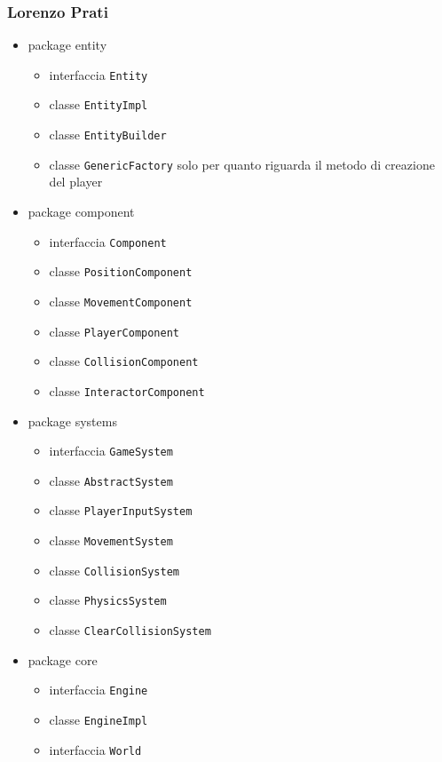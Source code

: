 \documentclass[a4paper,12pt]{report}
\begin{document}
\subsubsection{Lorenzo Prati}

	\begin{itemize}
		\item package entity
			\begin{itemize}
				\item interfaccia \texttt{Entity}
				\item classe \texttt{EntityImpl}
				\item classe \texttt{EntityBuilder}
				\item classe \texttt{GenericFactory} solo per quanto riguarda il metodo di creazione del player
			\end{itemize}
		\item package component
			\begin{itemize}
				\item interfaccia \texttt{Component}
				\item classe \texttt{PositionComponent}
				\item classe \texttt{MovementComponent}
				\item classe \texttt{PlayerComponent}
				\item classe \texttt{CollisionComponent}
				\item classe \texttt{InteractorComponent}
			\end{itemize}
		\item package systems
			\begin{itemize}
				\item interfaccia \texttt{GameSystem}
				\item classe \texttt{AbstractSystem}
				\item classe \texttt{PlayerInputSystem}
				\item classe \texttt{MovementSystem}
				\item classe \texttt{CollisionSystem}
				\item classe \texttt{PhysicsSystem}
				\item classe \texttt{ClearCollisionSystem}
			\end{itemize}
		\item package core
			\begin{itemize}
				\item interfaccia \texttt{Engine}
				\item classe \texttt{EngineImpl}
				\item interfaccia \texttt{World}

\end{itemize}
\end{itemize}
\end{document}
